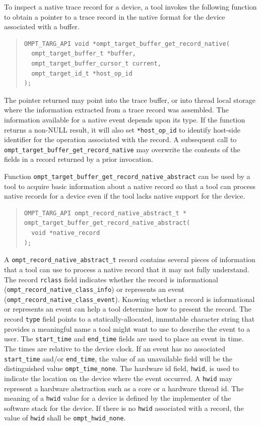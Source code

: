 \documentclass{article}
\begin{document}
To inspect a native trace record for a device, a tool invokes the following function to obtain a pointer to a trace record in the native format for the device associated with a buffer. \begin{quote}
\begin{verbatim}
OMPT_TARG_API void *ompt_target_buffer_get_record_native(
  ompt_target_buffer_t *buffer, 
  ompt_target_buffer_cursor_t current,
  ompt_target_id_t *host_op_id
);
\end{verbatim}
\end{quote}
The pointer returned  may point into the trace buffer, or into thread local storage where the information extracted from a trace record was assembled. The information available for a native event depends upon its type. If the function returns a non-NULL result, it will also set \verb|*host_op_id| to identify host-side identifier for the operation associated with the record.
A subsequent call to \verb|ompt_target_buffer_get_record_native| may overwrite the contents of the fields in a record returned by a prior invocation.

Function  \verb|ompt_target_buffer_get_record_native_abstract| can be
used by a tool to acquire basic information about a native record 
so that a tool can process native records for a device even if the
tool lacks native support for the device. 
\begin{quote}
\begin{verbatim}
OMPT_TARG_API ompt_record_native_abstract_t *
ompt_target_buffer_get_record_native_abstract(
  void *native_record 
);

\end{verbatim}
\end{quote}
A  \verb|ompt_record_native_abstract_t| record contains several pieces of information that a tool can use to process a native record that it may not fully understand. The record \verb|rclass| field indicates whether the record is informational (\verb|ompt_record_native_class_info|) or represents an event (\verb|ompt_record_native_class_event|). Knowing whether a record is informational or represents an event can help a tool determine how to present the record. The record  \verb|type| field points to a statically-allocated, immutable character string that provides  a meaningful name  a tool might want to use to describe the event to a user. The \verb|start_time| and \verb|end_time| fields are used to place an event in time. The times are relative to the device clock. If an event has no associated \verb|start_time| and/or \verb|end_time|, the value of an unavailable field will be the distinguished value \verb|ompt_time_none|. The hardware id field, \verb|hwid|,  is used to indicate the location on the device where the event occurred. A \verb|hwid| may represent a hardware abstraction such as a core or a hardware thread id. The meaning of a \verb|hwid| value for a device is defined by the implementer of the software stack for the device. If there is no \verb|hwid| associated with a record, the value of \verb|hwid| shall be \verb|ompt_hwid_none|. 
\end{document}
